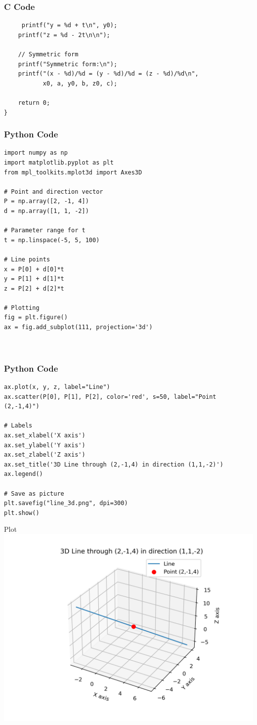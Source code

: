 \documentclass{beamer}
\begin{document}
\begin{frame}[fragile]
    \frametitle{C Code }
    \begin{lstlisting}
     printf("y = %d + t\n", y0);
    printf("z = %d - 2t\n\n");

    // Symmetric form
    printf("Symmetric form:\n");
    printf("(x - %d)/%d = (y - %d)/%d = (z - %d)/%d\n",
           x0, a, y0, b, z0, c);

    return 0;
}
    \end{lstlisting}
\end{frame}
\begin{frame}[fragile]
    \frametitle{Python Code}
    \begin{lstlisting}
import numpy as np
import matplotlib.pyplot as plt
from mpl_toolkits.mplot3d import Axes3D

# Point and direction vector
P = np.array([2, -1, 4])
d = np.array([1, 1, -2])

# Parameter range for t
t = np.linspace(-5, 5, 100)

# Line points
x = P[0] + d[0]*t
y = P[1] + d[1]*t
z = P[2] + d[2]*t

# Plotting
fig = plt.figure()
ax = fig.add_subplot(111, projection='3d')



    \end{lstlisting}
\end{frame}

\begin{frame}[fragile]
    \frametitle{Python Code}
    \begin{lstlisting}
ax.plot(x, y, z, label="Line")
ax.scatter(P[0], P[1], P[2], color='red', s=50, label="Point (2,-1,4)")

# Labels
ax.set_xlabel('X axis')
ax.set_ylabel('Y axis')
ax.set_zlabel('Z axis')
ax.set_title('3D Line through (2,-1,4) in direction (1,1,-2)')
ax.legend()

# Save as picture
plt.savefig("line_3d.png", dpi=300)
plt.show()
    \end{lstlisting}
\end{frame}
\begin{frame}{Plot}
    \centering
    \includegraphics[width=\columnwidth, height=0.8\textheight, keepaspectratio]{figs/linefig.png}     
\end{frame}
\end{document}
